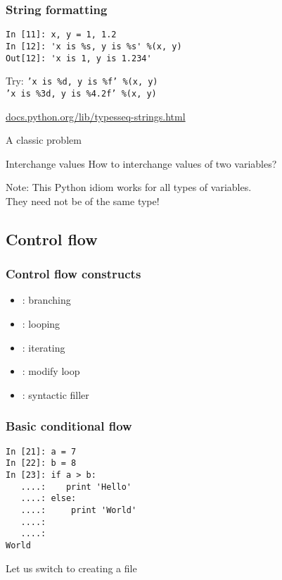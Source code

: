 \documentclass[14pt,compress]{beamer}
\newcounter{time}
\newcommand{\inctime}[1]{\addtocounter{time}{#1}{\tiny \thetime\ m}}
\newcommand{\kwrd}[1]{ \texttt{\textbf{\color{blue}{#1}}}  }
\begin{document}
\begin{frame}[fragile]\frametitle{String formatting}
  \begin{lstlisting}
In [11]: x, y = 1, 1.2
In [12]: 'x is %s, y is %s' %(x, y)
Out[12]: 'x is 1, y is 1.234'
  \end{lstlisting}
  \begin{block}{Try:}
    \texttt{'x is \%d, y is \%f' \%(x, y) }\\
    \texttt{'x is \%3d, y is \%4.2f' \%(x, y) }
  \end{block}
  \small
\url{docs.python.org/lib/typesseq-strings.html}\\
\end{frame}

\begin{frame}
  {A classic problem}
  \begin{block}
    {Interchange values}
    How to interchange values of two variables? 
  \end{block}
  \pause
  \begin{block}{Note:}
    This Python idiom works for all types of variables.\\
They need not be of the same type!
  \end{block}
  \inctime{30}
\end{frame}


\subsection{Control flow}
\begin{frame}
  \frametitle{Control flow constructs}  
  \begin{itemize}
  \item \kwrd{if/elif/else}: branching
  \item \kwrd{while}: looping
  \item \kwrd{for}: iterating 
  \item \kwrd{break, continue}: modify loop 
  \item \kwrd{pass}: syntactic filler
  \end{itemize}
\end{frame}

\begin{frame}[fragile]
  \frametitle{Basic conditional flow}
  \begin{lstlisting}
In [21]: a = 7
In [22]: b = 8
In [23]: if a > b:
   ....:    print 'Hello'
   ....: else:
   ....:     print 'World'
   ....:
   ....:
World
  \end{lstlisting}
  Let us switch to creating a file
\end{frame}
\end{document}
